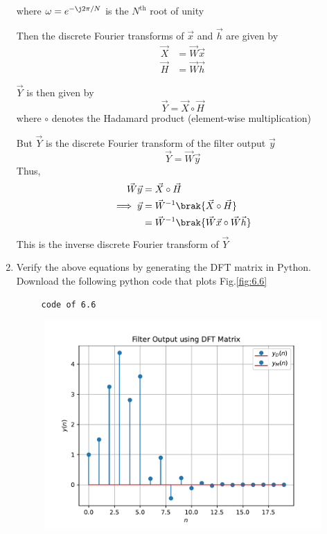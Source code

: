 \documentclass[journal,12pt,twocolumn]{IEEEtran}
\renewcommand\thesection{\arabic{section}}
\begin{document}
\begin{enumerate}[label=\thesection.\arabic*]
where $\omega = e^{-\j 2\pi/N}$ is the $N^{\mathrm{th}}$ root of unity

Then the discrete Fourier transforms of $\vec{x}$ and $\vec{h}$ are given by
\begin{align}
     \vec{X} &= \vec{W} \vec{x} \\
     \vec{H} &= \vec{W} \vec{h}
\end{align}

$\vec{Y}$ is then given by
\begin{equation}
     \vec{Y} = \vec{X} \circ \vec{H}
\end{equation}
where $\circ$ denotes the Hadamard product (element-wise multiplication)

But $\vec{Y}$ is the discrete Fourier transform of the filter output $\vec{y}$
\begin{equation}
     \vec{Y} = \vec{W} \vec{y}
\end{equation}
Thus,
\begin{align}
     \vec{W} \vec{y} &= \vec{X} \circ \vec{H} \\
     \implies \vec{y} &= \vec{W}^{-1} \brak{\vec{X} \circ \vec{H}} \\
     &= \vec{W}^{-1} \brak{\vec{W} \vec{x} \circ \vec{W} \vec{h}}
\end{align}
This is the inverse discrete Fourier transform of $\vec{Y}$
\item  Verify the above equations by generating the DFT matrix in Python. \\
\solution Download the following python code that plots Fig.\ref*{fig:6.6}
\begin{lstlisting}
     code of 6.6
\end{lstlisting}
\begin{figure}[!ht]
     \centering
     \includegraphics[width=\columnwidth]{figs/q6/6.6.pdf}

\end{figure}
\end{enumerate}
\end{document}
